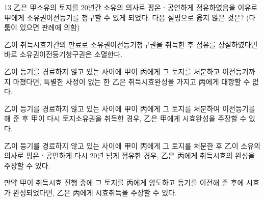 \begin{question}{13}
乙은 甲소유의 토지를 20년간 소유의 의사로 평온ㆍ공연하게 점유하였음을 이유로 甲에게 소유권이전등기를 청구할 수 있게 되었다. 다음 설명으로 옳지 않은 것은? (다툼이 있으면 판례에 의함)
\begin{choices}
  \item 乙이 취득시효기간의 만료로 소유권이전등기청구권을 취득한 후 점유를 상실하였다면 바로 소유권이전등기청구권은 소멸한다.
  \item 乙이 등기를 경료하지 않고 있는 사이에 甲이 丙에게 그 토지를 처분하고 이전등기까지 마쳤다면, 특별한 사정이 없는 한 乙은 취득시효완성을 가지고 丙에게 대항할 수 없다.
  \item 乙이 등기를 경료하지 않고 있는 사이에 甲이 丙에게 그 토지를 처분하여 이전등기를 해 준 후 甲이 다시 토지소유권을 취득한 경우, 乙은 甲에게 시효완성을 주장할 수 있다.
  \item 乙이 등기를 경료하지 않고 있는 사이에 甲이 丙에게 그 토지를 처분한 후 乙이 소유의 의사로 평온ㆍ공연하게 다시 20년 넘게 점유한 경우, 乙은 丙에게 취득시효의 완성을 주장할 수 있다.
  \item 만약 甲이 취득시효 진행 중에 그 토지를 丙에게 양도하고 등기를 이전해 준 후에 시효가 완성되었다면, 乙은 丙에게 시효취득을 주장할 수 있다.
\end{choices}
\end{question}
